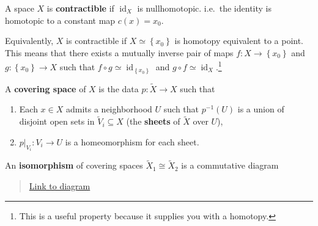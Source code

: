 \begin{definition}[Contractible]

A space \(X\) is \textbf{contractible} if \(\operatorname{id}_X\) is
nullhomotopic. i.e.~the identity is homotopic to a constant map
\(c(x) = x_0\).

Equivalently, \(X\) is contractible if \(X \simeq\left\{{x_0}\right\}\)
is homotopy equivalent to a point. This means that there exists a
mutually inverse pair of maps \(f: X \to\left\{{x_0}\right\}\) and
\(g:\left\{{x_0}\right\} \to X\) such that
\(f\circ g \simeq\operatorname{id}_{\left\{{x_0}\right\}}\) and
\(g\circ f \simeq\operatorname{id}_X\).\footnote{This is a useful
  property because it supplies you with a homotopy.}

\end{definition}

\begin{definition}[Coproduct]

\end{definition}


\begin{definition}

A \textbf{covering space} of \(X\) is the data \(p: \tilde X \to X\)
such that

\begin{enumerate}
\def\labelenumi{\arabic{enumi}.}
\tightlist
\item
  Each \(x\in X\) admits a neighborhood \(U\) such that \(p ^{-1} (U)\)
  is a union of disjoint open sets in \(\tilde V_i \subseteq X\) (the
  \textbf{sheets} of \(\tilde X\) over \(U\)),
\item
  \({ \left.{{p}} \right|_{{V_i}} }: V_i \to U\) is a homeomorphism for
  each sheet.
\end{enumerate}

An \textbf{isomorphism} of covering spaces
\(\tilde X_1 \cong \tilde X_2\) is a commutative diagram

\begin{center}
\end{center}

\begin{quote}
\href{https://q.uiver.app/?q=WzAsMyxbMCwwLCJcXHRpbGRlIFhfMSJdLFsxLDIsIlgiXSxbMiwwLCJcXHRpbGRlIFhfMiJdLFswLDEsInBfMSIsMl0sWzIsMSwicF8yIl0sWzAsMiwiZiJdXQ==}{Link
to diagram}
\end{quote}

\end{definition}

